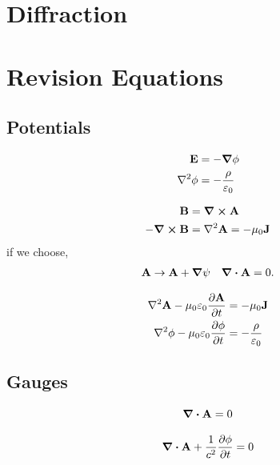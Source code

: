\documentclass{book}
\begin{document}
{\chapter{Diffraction}

\appendix
\chapter{Revision Equations}
\section{Potentials}
\begin{tcolorbox}[colback=red!5!white,colframe=red!75!black,title=Static Electric Potential]
	\begin{align}
		\vb{E} &= - \grad \phi \\
		\laplacian{\phi} &= - \frac{\rho}{\varepsilon_0}
	\end{align}
\end{tcolorbox}
\begin{tcolorbox}[colback=blue!5!white,colframe=blue!75!black,title=Static Magnetic Potential]
	\begin{align}
		\vb{B} &= \curl{\vb{A}} \\
		-\curl{\vb{B}} &= \laplacian{\vb{A}} = - \mu_0 \vb{J}
	\end{align} 
	if we choose,
	\begin{align}
		\vb{A} \to \vb{A} + \grad{\psi} && \div{\vb{A}} = 0.
	\end{align}
\end{tcolorbox}
\begin{tcolorbox}[colback=green!5!white,colframe=green!75!black,title=Dynamic Potentials]
	\begin{align}
		\laplacian\vb{A} - \mu_0\varepsilon_0 \pdv{\vb{A}}{t} &= - \mu_0 \vb{J} \label{eq:A} \\
		\laplacian\vb{\phi} - \mu_0\varepsilon_0\pdv{\phi}{t} &= -\frac{\rho}{\varepsilon_0} \label{eq:phi}
	\end{align}
\end{tcolorbox}
\section{Gauges}
\begin{tcolorbox}[colback=red!5!white,colframe=red!75!black,title=Coloumb Gauge]
	\begin{equation}
		\div{\vb{A}} = 0
	\end{equation}
\end{tcolorbox}
\begin{tcolorbox}[colback=blue!5!white,colframe=blue!75!black,title=Lorenz Gauge]
	\begin{equation}
		\div{\vb{A}} + \frac{1}{c^2}\pdv{\phi}{t} = 0
	\end{equation}
\end{tcolorbox}
}
\end{document}
